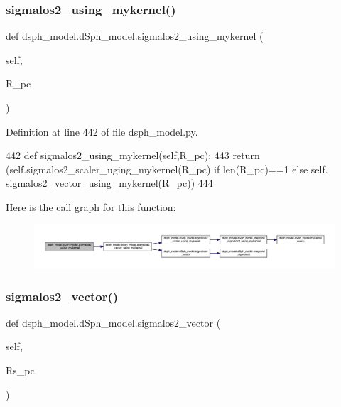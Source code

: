 \subsubsection{\texorpdfstring{sigmalos2\+\_\+using\+\_\+mykernel()}{sigmalos2\_using\_mykernel()}}
{\footnotesize\ttfamily def dsph\+\_\+model.\+d\+Sph\+\_\+model.\+sigmalos2\+\_\+using\+\_\+mykernel (\begin{DoxyParamCaption}\item[{}]{self,  }\item[{}]{R\+\_\+pc }\end{DoxyParamCaption})}



Definition at line 442 of file dsph\+\_\+model.\+py.


\begin{DoxyCode}
442     \textcolor{keyword}{def }sigmalos2\_using\_mykernel(self,R\_pc):
443         \textcolor{keywordflow}{return} (self.sigmalos2\_scaler\_uging\_mykernel(R\_pc) \textcolor{keywordflow}{if} len(R\_pc)==1 \textcolor{keywordflow}{else} self.
      sigmalos2\_vector\_using\_mykernel(R\_pc))
444     
\end{DoxyCode}
Here is the call graph for this function\+:\nopagebreak
\begin{figure}[H]
\begin{center}
\leavevmode
\includegraphics[width=350pt]{d0/d25/classdsph__model_1_1dSph__model_a4e062f0ac546057c1109fd47ec39ed90_cgraph}
\end{center}
\end{figure}
\mbox{\label{classdsph__model_1_1dSph__model_a5170edb309402dc101ea76871645e65f}} 
\subsubsection{\texorpdfstring{sigmalos2\+\_\+vector()}{sigmalos2\_vector()}}
{\footnotesize\ttfamily def dsph\+\_\+model.\+d\+Sph\+\_\+model.\+sigmalos2\+\_\+vector (\begin{DoxyParamCaption}\item[{}]{self,  }\item[{}]{Rs\+\_\+pc }\end{DoxyParamCaption})}



